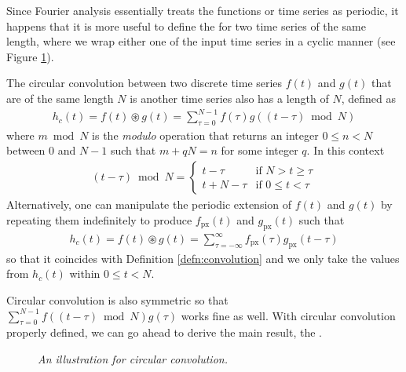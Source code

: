 Since Fourier analysis essentially treats the functions or time series as periodic, it happens that it is more useful to define the  for two time series of the same length, where we wrap either one of the input time series in a cyclic manner (see Figure \ref{fig:circconvschm}).
\begin{defn}
The circular convolution  between two discrete time series $f(t)$ and $g(t)$ that are of the same length $N$ is another time series also has a length of $N$, defined as
\begin{align}
h_c(t) = f(t) \circledast g(t) = \sum_{\tau=0}^{N-1} f(\tau) g((t-\tau) \bmod N)
\end{align}
where $m \bmod N$ is the \textit{modulo} operation that returns an integer $0 \leq n < N$ between $0$ and $N-1$ such that $m + qN = n$ for some integer $q$. In this context
\begin{align}
(t-\tau) \bmod N = 
\begin{cases}
t - \tau & \text{if $N > t \geq \tau$} \\
t + N - \tau & \text{if $0\leq t < \tau$}
\end{cases}
\end{align}
Alternatively, one can manipulate the periodic extension of $f(t)$ and $g(t)$ by repeating them indefinitely to produce $f_\text{px}(t)$ and $g_\text{px}(t)$ such that 
\begin{align}
h_c(t) = f(t) \circledast g(t) = \sum_{\tau=-\infty}^{\infty} f_\text{px}(\tau) g_\text{px}(t-\tau)
\end{align}
so that it coincides with Definition \ref{defn:convolution} and we only take the values from $h_c(t)$ within $0 \leq t < N$.
\end{defn}
Circular convolution is also symmetric so that $\sum_{\tau=0}^{N-1} f((t-\tau) \bmod N) g(\tau)$ works fine as well. With circular convolution properly defined, we can go ahead to derive the main result, the .
\begin{figure}[t!]
    \centering
    \caption{\textit{An illustration for circular convolution.}}
    \label{fig:circconvschm}
\end{figure}
